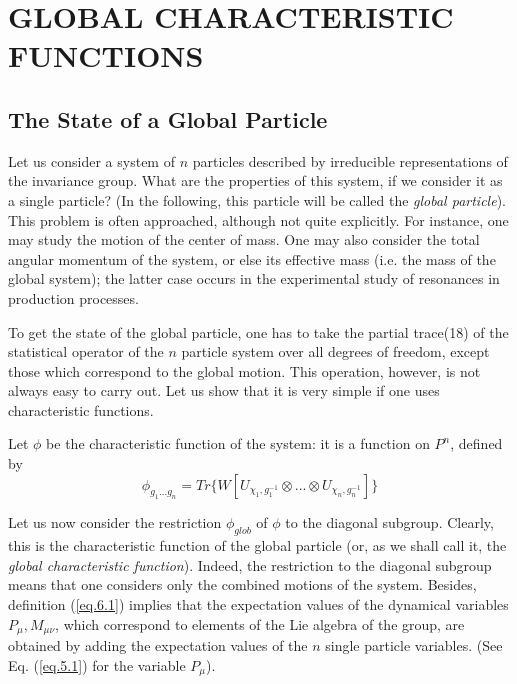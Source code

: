 \documentclass[a4paper,11pt]{article}
\begin{document}
\section{GLOBAL CHARACTERISTIC FUNCTIONS}

\subsection{The State of a Global Particle}

Let us consider a system of $n$ particles described by irreducible representations of the 
invariance group. What are the properties of this system, if we consider it as a single 
particle? (In the following, this particle will be called the {\it global particle}). This 
problem is 
often approached, although not quite explicitly. For instance, one may study the motion of the 
center of mass. One may also consider the total angular momentum of the system, or else its 
effective mass (i.e. the mass of the global system); the latter case occurs in the experimental 
study of resonances in production processes. 

To get the state of the global particle, one has to take the partial trace(18) of the 
statistical operator of the $n$ particle system over all degrees of freedom, except those which 
correspond to the global motion. This operation, however, is not always easy to carry out. Let 
us show that it is very simple if one uses characteristic functions. 

Let $\phi$ be the characteristic function of the system: it is a function on $P^n$, defined by 
\begin{equation}
 \label{eq.6.1}
    \phi_{g_1 ... g_n} = Tr \{ W [ U_{\chi_1,g_1^{-1}} \otimes ... \otimes U_{\chi_n,g_n^{-1}} ] \} 
\end{equation}

Let us now consider the restriction $\phi_{glob}$ of $\phi$ to the diagonal subgroup. Clearly, 
this 
is the characteristic function of the global particle (or, as we shall call it, the {\it global 
characteristic function}). Indeed, the restriction to the diagonal subgroup means that one 
considers only the combined motions of the system. Besides, definition (\ref{eq.6.1}) implies 
that the 
expectation values of the dynamical variables $P_{\mu}, M_{\mu \nu}$, which correspond to 
elements of the Lie 
algebra of the group, are obtained by adding the expectation values of the $n$ single particle 
variables. (See Eq. (\ref{eq.5.1}) for the variable $P_{\mu}$). 
\end{document}
